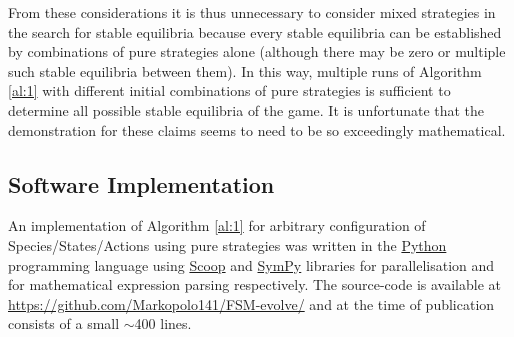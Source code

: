 From these considerations it is thus unnecessary to consider mixed strategies in the search for stable equilibria because every stable equilibria can be established by combinations of pure strategies alone (although there may be zero or multiple such stable equilibria between them).
In this way, multiple runs of Algorithm \ref{al:1} with different initial combinations of pure strategies is sufficient to determine all possible stable equilibria of the game.
It is unfortunate that the demonstration for these claims seems to need to be so exceedingly mathematical.

\subsection{Software Implementation}\label{sec:implementation}
An implementation of Algorithm \ref{al:1} for arbitrary configuration of Species/States/Actions using pure strategies was written in the \href{https://www.python.org/}{Python} programming language using \href{http://pyscoop.org/}{Scoop} and \href{http://www.sympy.org/}{SymPy} libraries for parallelisation and for mathematical expression parsing respectively. The source-code is available at \href{https://github.com/Markopolo141/FSM-evolve/}{https://github.com/Markopolo141/FSM-evolve/} and at the time of publication consists of a small $\sim$400 lines.

